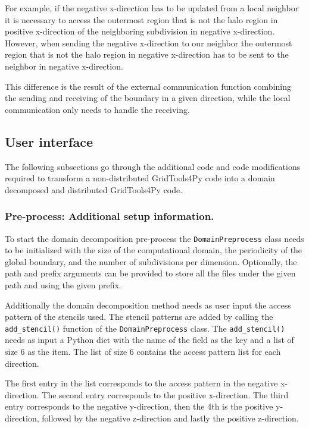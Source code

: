 For example, if the negative x-direction has to be updated from a local neighbor it is necessary to access the outermost region that is not the halo region in positive x-direction of the neighboring subdivision in negative x-direction.
However, when sending the negative x-direction to our neighbor the outermost region that is not the halo region in negative x-direction has to be sent to the neighbor in negative x-direction.

This difference is the result of the external communication function combining the sending and receiving of the boundary in a given direction, while the local communication only needs to handle the receiving.


\newpage
\subsection{User interface}
The following subsections go through the additional code and code modifications required to transform a non-distributed GridTools4Py code into a domain decomposed and distributed GridTools4Py code.

\subsubsection{Pre-process: Additional setup information.}
\label{sec:userpreprocess}
To start the domain decomposition pre-process the \texttt{DomainPreprocess} class needs to be initialized with the size of the computational domain, the periodicity of the global boundary, and the number of subdivisions per dimension.
Optionally, the path and prefix arguments can be provided to store all the files under the given path and using the given prefix.

Additionally the domain decomposition method needs as user input the access pattern of the stencils used.
The stencil patterns are added by calling the \texttt{add\_stencil()} function of the \texttt{DomainPreprocess} class.
The \texttt{add\_stencil()} needs as input a Python dict with the name of the field as the key and a list of size 6 as the item.
The list of size 6 contains the access pattern list for each direction.

The first entry in the list corresponds to the access pattern in the negative x-direction.
The second entry corresponds to the positive x-direction.
The third entry corresponds to the negative y-direction, then the 4th is the positive y-direction, followed by the negative z-direction and lastly the positive z-direction.

